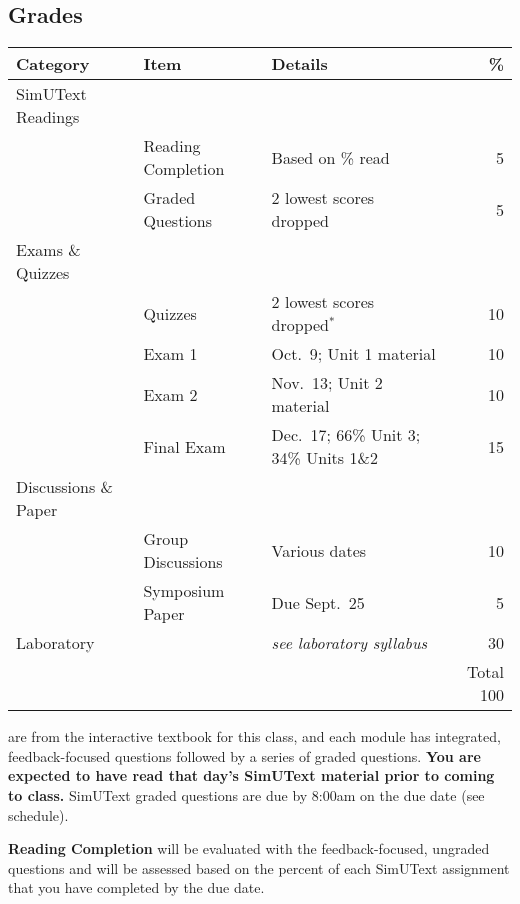 \documentclass{tufte-handout}
\begin{document}
\begin{fullwidth}
\section{Grades}


\begin{table}
\begin{tabular}{l l l r}
Category & Item & Details & \% \\
\hline
SimUText Readings & \\
& Reading Completion & Based on \% read & 5 \\
& Graded Questions & 2 lowest scores dropped & 5 \\
\hline
Exams \& Quizzes \\
& Quizzes & 2 lowest scores dropped$^*$ & 10 \\
& Exam 1 & Oct.~9; Unit 1 material & 10 \\
& Exam 2 & Nov.~13; Unit 2 material & 10 \\
& Final Exam & Dec.~17; 66\% Unit 3; 34\% Units 1\&2 & 15 \\ 							%
\hline 
Discussions \& Paper \\
& Group Discussions & Various dates & 10 \\
 & Symposium Paper & Due Sept.~25 & 5 \\
\hline
Laboratory & & \emph{see laboratory syllabus} & 30 \\
\hline
& & & Total 100
\end{tabular}
\end{table}

\end{fullwidth}

 are from the interactive textbook for this class, and each module has integrated, feedback-focused questions followed by a series of graded questions. \textbf{You are expected to have read that day's SimUText material prior to coming to class. } SimUText graded questions are due by 8:00am on the due date (see schedule).

\textbf{Reading Completion} will be evaluated with the feedback-focused, ungraded questions and will be assessed based on the percent of each SimUText assignment that you have completed by the due date. 
\end{document}
